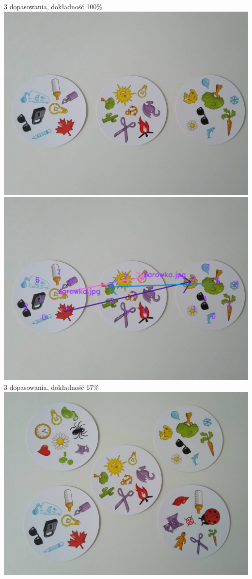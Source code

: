 \documentclass[10pt,a4paper]{article}
\begin{document}
\begin{center}
3 dopasowania, dokładność 100\%
\includegraphics[scale=0.28]{hard/dobble13.jpg}
\includegraphics[scale=0.28]{hard/img_arrows2.jpg}\\
3 dopasowania, dokładność 67\%
\includegraphics[scale=0.28]{hard/dobble14.jpg}

\end{center}
\end{document}
